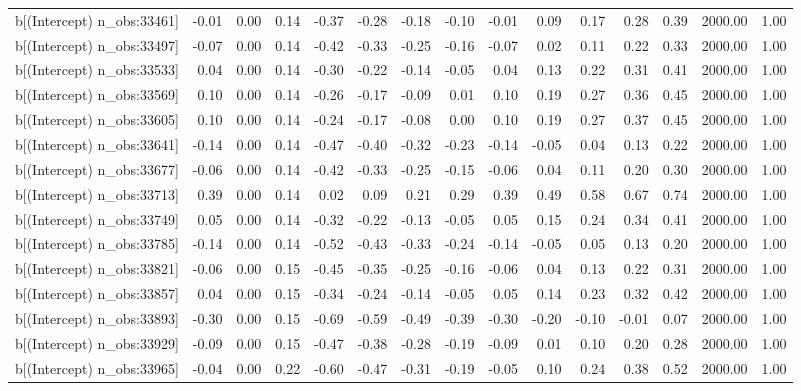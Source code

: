 \begin{table}[ht]
\begin{tabular}{rrrrrrrrrrrrrrr}
  b[(Intercept) n\_obs:33461] & -0.01 & 0.00 & 0.14 & -0.37 & -0.28 & -0.18 & -0.10 & -0.01 & 0.09 & 0.17 & 0.28 & 0.39 & 2000.00 & 1.00 \\ 
  b[(Intercept) n\_obs:33497] & -0.07 & 0.00 & 0.14 & -0.42 & -0.33 & -0.25 & -0.16 & -0.07 & 0.02 & 0.11 & 0.22 & 0.33 & 2000.00 & 1.00 \\ 
  b[(Intercept) n\_obs:33533] & 0.04 & 0.00 & 0.14 & -0.30 & -0.22 & -0.14 & -0.05 & 0.04 & 0.13 & 0.22 & 0.31 & 0.41 & 2000.00 & 1.00 \\ 
  b[(Intercept) n\_obs:33569] & 0.10 & 0.00 & 0.14 & -0.26 & -0.17 & -0.09 & 0.01 & 0.10 & 0.19 & 0.27 & 0.36 & 0.45 & 2000.00 & 1.00 \\ 
  b[(Intercept) n\_obs:33605] & 0.10 & 0.00 & 0.14 & -0.24 & -0.17 & -0.08 & 0.00 & 0.10 & 0.19 & 0.27 & 0.37 & 0.45 & 2000.00 & 1.00 \\ 
  b[(Intercept) n\_obs:33641] & -0.14 & 0.00 & 0.14 & -0.47 & -0.40 & -0.32 & -0.23 & -0.14 & -0.05 & 0.04 & 0.13 & 0.22 & 2000.00 & 1.00 \\ 
  b[(Intercept) n\_obs:33677] & -0.06 & 0.00 & 0.14 & -0.42 & -0.33 & -0.25 & -0.15 & -0.06 & 0.04 & 0.11 & 0.20 & 0.30 & 2000.00 & 1.00 \\ 
  b[(Intercept) n\_obs:33713] & 0.39 & 0.00 & 0.14 & 0.02 & 0.09 & 0.21 & 0.29 & 0.39 & 0.49 & 0.58 & 0.67 & 0.74 & 2000.00 & 1.00 \\ 
  b[(Intercept) n\_obs:33749] & 0.05 & 0.00 & 0.14 & -0.32 & -0.22 & -0.13 & -0.05 & 0.05 & 0.15 & 0.24 & 0.34 & 0.41 & 2000.00 & 1.00 \\ 
  b[(Intercept) n\_obs:33785] & -0.14 & 0.00 & 0.14 & -0.52 & -0.43 & -0.33 & -0.24 & -0.14 & -0.05 & 0.05 & 0.13 & 0.20 & 2000.00 & 1.00 \\ 
  b[(Intercept) n\_obs:33821] & -0.06 & 0.00 & 0.15 & -0.45 & -0.35 & -0.25 & -0.16 & -0.06 & 0.04 & 0.13 & 0.22 & 0.31 & 2000.00 & 1.00 \\ 
  b[(Intercept) n\_obs:33857] & 0.04 & 0.00 & 0.15 & -0.34 & -0.24 & -0.14 & -0.05 & 0.05 & 0.14 & 0.23 & 0.32 & 0.42 & 2000.00 & 1.00 \\ 
  b[(Intercept) n\_obs:33893] & -0.30 & 0.00 & 0.15 & -0.69 & -0.59 & -0.49 & -0.39 & -0.30 & -0.20 & -0.10 & -0.01 & 0.07 & 2000.00 & 1.00 \\ 
  b[(Intercept) n\_obs:33929] & -0.09 & 0.00 & 0.15 & -0.47 & -0.38 & -0.28 & -0.19 & -0.09 & 0.01 & 0.10 & 0.20 & 0.28 & 2000.00 & 1.00 \\ 
  b[(Intercept) n\_obs:33965] & -0.04 & 0.00 & 0.22 & -0.60 & -0.47 & -0.31 & -0.19 & -0.05 & 0.10 & 0.24 & 0.38 & 0.52 & 2000.00 & 1.00 \\ 

\end{tabular}
\end{table}
